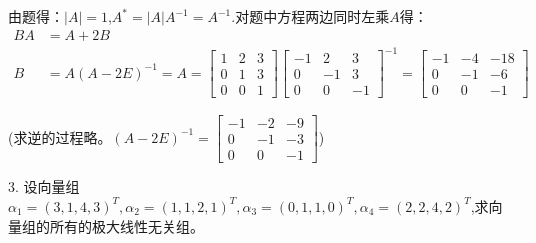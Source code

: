 \documentclass{article}
\begin{document}
\begin{jie}
由题得：$|A|=1$,$A^*=|A|A^{-1}=A^{-1}$.对题中方程两边同时左乘$A$得：
\begin{align*}
BA&=A+2B\\
B&=A(A-2E)^{-1}=A=
\begin{bmatrix}
  1 & 2 & 3 \\
  0 & 1 & 3\\
  0 & 0 & 1
\end{bmatrix}
\begin{bmatrix}
  -1 & 2 & 3 \\
  0 & -1 & 3\\
  0 & 0 & -1
\end{bmatrix}^{-1}=\begin{bmatrix}
  -1 & -4 & -18 \\
  0 & -1 & -6\\
  0 & 0 & -1
\end{bmatrix}
\end{align*}

(求逆的过程略。$(A-2E)^{-1}=\begin{bmatrix}
  -1 & -2 & -9 \\
  0 & -1 & -3\\
  0 & 0 & -1
\end{bmatrix}$)
\end{jie}

3. 设向量组$\alpha_{1}=(3,1,4,3)^{T},\alpha_{2}=(1,1,2,1)^{T},\alpha_{3}=(0,1,1,0)^{T},\alpha_{4}=(2,2,4,2)^{T}$,求向量组的所有的极大线性无关组。
\end{document}
